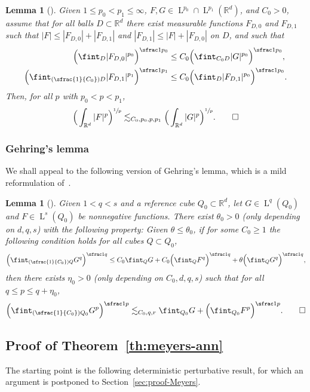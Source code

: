 \documentclass[10pt]{amsart}
\newcommand{\Psfrac}[2]{(\sfrac{#1}{#2})}
\theoremstyle{plain}
\newtheorem{lem}[theor]{Lemma}
\theoremstyle{definition}
\newcommand{\R}{\mathbb R}
\newcommand{\Ld}{\operatorname{L}}
\begin{document}
\begin{lem}[\cite{Shen-07}]\label{lem:Shen}
Given $1\le p_0<p_1\le\infty$, $F,G\in\Ld^{p_0}\cap\Ld^{p_1}(\R^d)$, and $C_0>0$, assume that for all balls $D\subset \R^d$ there exist measurable functions $F_{D,0}$ and $F_{D,1}$ such that \mbox{$|F|\le |F_{D,0}|+|F_{D,1}|$} and $|F_{D,1}|\le |F|+|F_{D,0}|$ on $D$, and such that
\begin{align*}
\Big(\fint_{D}|F_{D,0}|^{p_0}\Big)^{\sfrac1{p_0}}&\le C_0\Big(\fint_{C_0D}|G|^{p_0}\Big)^{\sfrac1{p_0}},\\
\Big(\fint_{\Psfrac1{C_0}D}|F_{D,1}|^{p_1}\Big)^{\sfrac1{p_1}}&\le C_0\Big(\fint_{D}|F_{D,1}|^{p_0}\Big)^{\sfrac1{p_0}}.
\end{align*}
Then,
for all $p$ with $p_0<p<p_1$,
\[\Big(\int_{\R^d}|F|^p\Big)^{\sfrac1p}\lesssim_{C_0,p_0,p,p_1}\Big(\int_{\R^d}|G|^p\Big)^{\sfrac1p}.\qedhere\]
\end{lem}

\subsubsection{Gehring's lemma}
We shall appeal to the following version of Gehring's lemma, which is a mild reformulation of~\cite[Prop.\,5.1]{GiaMo}.

\begin{lem}[\cite{Gehring,GiaMo}]\label{lem:Gehring}
Given $1<q<s$ and a reference cube $Q_0\subset\R^d$, let $G\in\Ld^q(Q_0)$ and $F\in\Ld^s(Q_0)$ be nonnegative functions.
There exist $\theta_0>0$ (only depending on $d,q,s$) with the following property:
Given $\theta\le\theta_0$, if for some $C_0\ge1$ the following condition holds for all cubes $Q\subset Q_0$,
\[\Big(\fint_{\Psfrac1{C_0}Q}G^q\Big)^{\sfrac1q}\le C_0\fint_{Q}G+C_0\Big(\fint_{Q}F^q\Big)^{\sfrac1q}+\theta\Big(\fint_{Q}G^q\Big)^{\sfrac1q},\]
then there exists $\eta_0>0$ (only depending on $C_0,d,q,s$) such that for all $q\le p\le q+\eta_0$,
\[\Big(\fint_{\Psfrac1{C_0}Q_0}G^p\Big)^{\sfrac1p}\lesssim_{C_0,q,r}\fint_{Q_0}G+\Big(\fint_{Q_0}F^p\Big)^{\sfrac1p}.\qedhere\]
\end{lem}

\subsection{Proof of Theorem~\ref{th:meyers-ann}}
The starting point is the following deterministic perturbative result, for which an argument is postponed to Section~\ref{sec:proof-Meyers}.
\end{document}
